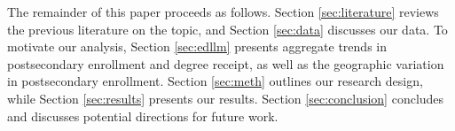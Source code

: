 
The remainder of this paper proceeds as follows. Section \ref{sec:literature} reviews the previous literature on the topic, and Section \ref{sec:data} discusses our data. To motivate our analysis, Section \ref{sec:edllm} presents aggregate trends in postsecondary enrollment and degree receipt, as well as the geographic variation in postsecondary enrollment. Section \ref{sec:meth} outlines our research design, while Section \ref{sec:results} presents our results. Section \ref{sec:conclusion} concludes and discusses potential directions for future work.